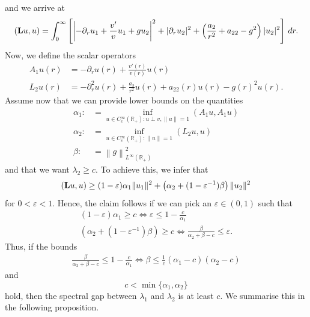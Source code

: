 \documentclass[11pt,reqno]{amsart}
\theoremstyle{remark}
\newcommand{\R}{\mathbb{R}}
\newcommand{\Lf}{\textup{\textbf{L}}}
\theoremstyle{definition}
\begin{document}
and we arrive at
\begin{align*}
    (\Lf u,u)
    =\int_0^\infty\left[
        \left|-\partial_r u_1+\frac{v'}{v}u_1+g u_2\right|^2
        +|\partial_r u_2|^2
        +\left(\frac{a_2}{r^2}+a_{22}-g^2\right)|u_2|^2
    \right]\,dr.
\end{align*}
Now, we define the scalar operators \begin{align*}
    A_1 u(r)&= -\partial_r u(r)+\frac{v'(r)}{v(r)}u(r)
    \\
    L_2u(r)&=- \partial_r^2 u(r)+\frac{a_2}{r^2}u(r)+a_{22}(r) u(r)-g(r)^2 u(r). 
\end{align*}
Assume now that we can provide lower bounds on the quantities
\begin{align*}
    \alpha_1:&=\inf_{u\in C{^\infty_c}(\R_+): u\perp v, \|u\|=1} (A_1u,A_1 u)
    \\
      \alpha_2:&=\inf_{u\in C{^\infty_c}(\R_+):\|u\|=1} (L_2u,u)
      \\
      \beta:&= \left\| g\right\|_{L^\infty(\R_+)}^2
\end{align*}
and that we want $\lambda_2 \geq c$. To achieve this, we infer that 
\begin{align*}
     (\Lf u,u)\geq (1-\varepsilon) \alpha_1 \|u_1\|^2+\left(\alpha_2+(1-\varepsilon^{-1})\beta\right) \|u_2\|^2
\end{align*}
for $0<\varepsilon<1$. Hence, the claim follows if we can pick an $\varepsilon \in (0,1)$ such that
\begin{align*}
    (1-\varepsilon)\alpha_1 \geq c \iff \varepsilon\leq 1-\frac{c}{\alpha_1}
    \\
    \left(\alpha_2+(1-\varepsilon^{-1})\beta\right)\geq c \iff \frac{\beta}{\alpha_2+\beta-c}\leq \varepsilon.
\end{align*}
Thus, if the bounds
\begin{align*}
 \frac{\beta}{\alpha_2+\beta-c}    \leq 1-\frac{c}{\alpha_1}\iff \beta \leq \frac{1}{c}(\alpha_1-c)(\alpha_2-c)
\end{align*}
and 
$$
c< \min\{\alpha_1,\alpha_2\}
$$
hold, then the spectral gap between $\lambda_1$ and $\lambda_2$ is at least $c$.
We summarise this in the following proposition.
\end{document}
